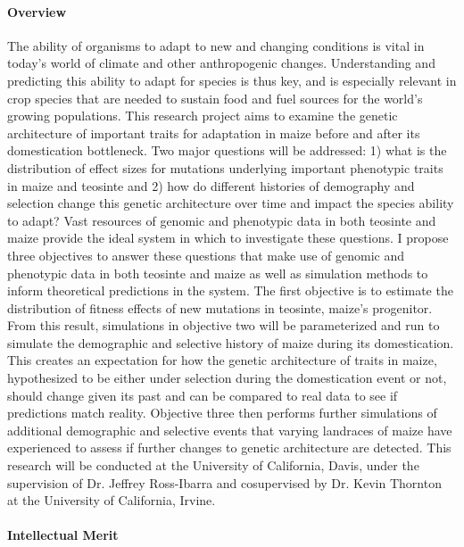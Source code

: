 
\paragraph{Overview} 

The ability of organisms to adapt to new and changing conditions is vital in today's world of climate and other anthropogenic changes. Understanding and predicting this ability to adapt for species is thus key, and is especially relevant in crop species that are needed to sustain food and fuel sources for the world's growing populations. This research project aims to examine the genetic architecture of important traits for adaptation in maize before and after its domestication bottleneck. Two major questions will be addressed: 1) what is the distribution of effect sizes for mutations %
underlying important phenotypic traits in maize and teosinte and 2) how do different histories of demography and selection change this genetic architecture over time and impact the species ability to adapt? Vast resources of genomic and phenotypic data in both teosinte and maize provide the ideal system in which to investigate these questions. I propose three objectives to answer these questions that make use of genomic and phenotypic data in both teosinte and maize as well as simulation methods to inform theoretical predictions in the system. The first objective is to estimate the distribution of fitness effects of new mutations in teosinte, maize's progenitor. From this result, simulations in objective two will be parameterized and run to simulate %
the demographic and selective history of maize during its domestication. This creates an expectation for how the genetic architecture of traits in maize, hypothesized to be either under selection during the domestication event or not, should change given its past and can be compared to real data to see if predictions match reality. Objective three then performs further simulations of additional demographic and selective events that varying landraces of maize have experienced to assess if further changes to genetic architecture are detected. This research will be conducted at the University of California, Davis, under the supervision of Dr. Jeffrey Ross\--Ibarra and cosupervised by Dr. Kevin Thornton at the University of California, Irvine.


\paragraph{Intellectual Merit}  

